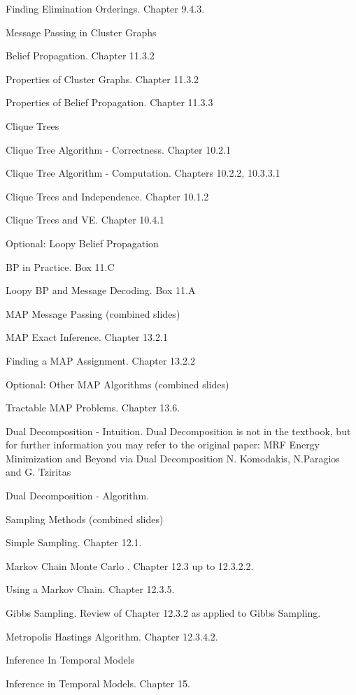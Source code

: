 \documentclass[12pt]{article}
\numberwithin{equation}{section}
\begin{document}
Finding Elimination Orderings. Chapter 9.4.3.

Message Passing in Cluster Graphs

Belief Propagation. Chapter 11.3.2

Properties of Cluster Graphs. Chapter 11.3.2

Properties of Belief Propagation. Chapter 11.3.3

Clique Trees

Clique Tree Algorithm - Correctness. Chapter 10.2.1

Clique Tree Algorithm - Computation. Chapters 10.2.2, 10.3.3.1

Clique Trees and Independence. Chapter 10.1.2

Clique Trees and VE. Chapter 10.4.1

Optional: Loopy Belief Propagation

BP in Practice. Box 11.C

Loopy BP and Message Decoding. Box 11.A

MAP Message Passing (combined slides)

MAP Exact Inference. Chapter 13.2.1

Finding a MAP Assignment. Chapter 13.2.2

Optional: Other MAP Algorithms (combined slides)

Tractable MAP Problems. Chapter 13.6.

Dual Decomposition - Intuition. Dual Decomposition is not in the textbook, but for further information you may refer to the original paper: MRF Energy Minimization and Beyond via Dual Decomposition N. Komodakis, N.Paragios and G. Tziritas

Dual Decomposition - Algorithm.

Sampling Methods (combined slides)

Simple Sampling. Chapter 12.1.

Markov Chain Monte Carlo . Chapter 12.3 up to 12.3.2.2.

Using a Markov Chain. Chapter 12.3.5.

Gibbs Sampling. Review of Chapter 12.3.2 as applied to Gibbs Sampling.

Metropolis Hastings Algorithm. Chapter 12.3.4.2.

Inference In Temporal Models

Inference in Temporal Models. Chapter 15.

\renewcommand\refname{Reference}



  \clearpage
\end{document}
